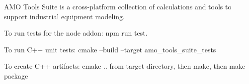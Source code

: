 A\+MO Tools Suite is a cross-\/platform collection of calculations and tools to support industrial equipment modeling.

To run tests for the node addon\+: npm run test.

To run C++ unit tests\+: cmake --build --target amo\+\_\+tools\+\_\+suite\+\_\+tests

To create C++ artifacts\+: cmake .. from target directory, then make, then make package 